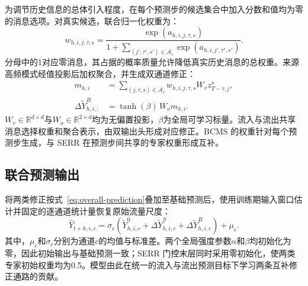 为调节历史信息的总体引入程度，在每个预测步的候选集合中加入分数和值均为零的消息选项。对真实候选，联合归一化权重为：
\begin{equation}
\label{eq:joint-message-softmax}
w_{h,i,j,\tau,s}
=\frac{\exp(a_{h,i,j,\tau,s})}
{1+\displaystyle\sum_{(j',\tau',s')\in\mathcal{A}_i}\exp(a_{h,i,j',\tau',s'})}.
\end{equation}
分母中的1对应零消息，其占据的概率质量允许降低真实历史消息的总权重。来源高频模式经值投影后加权聚合，并生成双通道修正：
\begin{equation}
\label{eq:bcms-residual}
\begin{aligned}
m_{h,i}&=\sum_{(j,\tau,s)\in\mathcal{A}_i}
w_{h,i,j,\tau,s}W_vz^s_{T-\tau,j},\\
\Delta\widetilde{Y}^{B}_{h,i,:}&=\tanh(\beta)\,W_o m_{h,i}.
\end{aligned}
\end{equation}
\(W_v\in\mathbb{R}^{d\times d}\)与\(W_o\in\mathbb{R}^{2\times d}\)均为无偏置投影，\(\beta\)为全局可学习标量。流入与流出共享消息选择权重和聚合表示，由双输出头形成对应修正。BCMS 的权重针对每个预测步生成，与 SERR 在预测步间共享的专家权重形成互补。

\subsection{联合预测输出}\label{sec:joint-output}

将两类修正按式~\eqref{eq:overall-prediction}叠加至基础预测后，使用训练期输入窗口估计并固定的逐通道统计量恢复原始流量尺度：
\begin{equation}
\label{eq:inverse-scaling}
\widehat{Y}_{t+h,i,c}
=\sigma_c\left(\widetilde{Y}^{0}_{h,i,c}
+\Delta\widetilde{Y}^{S}_{h,i,c}+\Delta\widetilde{Y}^{B}_{h,i,c}\right)+\mu_c.
\end{equation}
其中，\(\mu_c\)和\(\sigma_c\)分别为通道\(c\)的均值与标准差。两个全局强度参数\(\alpha\)和\(\beta\)均初始化为零，因此初始输出与基础预测一致；SERR 门控末层同时采用零初始化，使两类专家初始权重均为0.5。模型由此在统一的流入与流出预测目标下学习两条互补修正通路的贡献。
